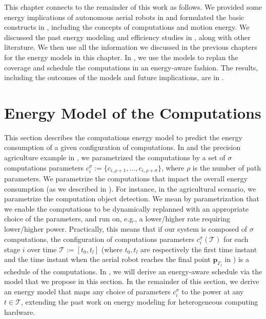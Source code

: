 This chapter connects to the remainder of this work as follows. We provided some energy implications of autonomous aerial robots in  and formulated the basic constructs in , including the concepts of computations and motion energy. We discussed the past energy modeling and efficiency studies in , along with other literature. We then use all the information we discussed in the previous chapters for the energy models in this chapter. In , we use the models to replan the coverage and schedule the computations in an energy-aware fashion. The results, including the outcomes of the models and future implications, are in .



\section{Energy Model of the Computations}
\label{sec:comp-ener-model}

This section describes the computations energy model to predict the energy consumption of a given configuration of computations. In  and the precision agriculture example in , we parametrized the computations by a set of $\sigma$ computations parameters $c_{i}^\sigma:=\{c_{i,\rho+1},\dots,c_{i,\rho+\sigma}\}$, where $\rho$ is the number of path parameters. We parametrize the computations that impact the overall energy consumption (as we described in ). For instance, in the agricultural scenario, we parametrize the computation object detection. We mean by parametrization that we enable the computations to be dynamically replanned with an appropriate choice of the parameters, and run on, e.g., a lower/higher rate requiring lower/higher power. Practically, this means that if our system is composed of $\sigma$ computations, the configuration of computations parameters $c_i^\sigma(\mathcal{T})$ for each stage $i$ over time $\mathcal{T}:=[t_0,t_l]$ (where $t_0,t_l$ are respectively the first time instant and the time instant when the aerial robot reaches the final point $\mathbf{p}_{\Gamma_l}$ in ) is a schedule of the computations. In , we will derive an energy-aware schedule via the model that we propose in this section.
In the remainder of this section, we derive an energy model that maps any choice of parameters $c_{i}^{\sigma}$ to the power at any $t\in\mathcal{T}$, extending the past work on energy modeling for heterogeneous computing hardware.

